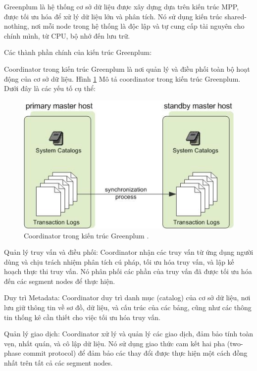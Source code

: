 \documentclass{article}[14pt]
\begin{document}
{Greenplum là hệ thống cơ sở dữ liệu được xây dựng dựa trên kiến
trúc MPP, được tối ưu hóa để xử lý dữ liệu lớn và phân tích. Nó sử dụng kiến
trúc shared-nothing, nơi mỗi node trong hệ thống là độc lập và tự cung cấp tài nguyên cho chính mình, từ CPU, bộ nhớ đến lưu trữ.

Các thành phần chính của kiến trúc Greenplum:

Coordinator trong kiến trúc Greenplum là nơi quản lý và điều phối
toàn bộ hoạt động của cơ sở dữ liệu. Hình \ref{fig:admin_guide-graphics-standby_coordinator} Mô tả coordinator trong kiến trúc Greenplum.
Dưới đây là các yếu tố cụ thể:


\begin{figure}[htbp]
\centerline{\includegraphics[scale=.7]{images/admin_guide-graphics-standby_coordinator.jpg}}
\captionsetup{font=Large}
\caption{Coordinator trong kiến trúc Greenplum \cite{vmware_greenplum}.}
\label{fig:admin_guide-graphics-standby_coordinator}
\end{figure}

Quản lý truy vấn và điều phối: Coordinator nhận các truy vấn từ ứng dụng người dùng và chịu trách nhiệm phân tích cú pháp, tối ưu hóa truy vấn, và lập kế hoạch thực thi truy vấn. Nó phân phối các phần của truy vấn đã được tối ưu hóa đến các segment nodes để thực hiện.


Duy trì Metadata: Coordinator duy trì danh mục (catalog) của cơ sở dữ liệu, nơi lưu giữ thông tin về sơ đồ, dữ liệu, và cấu trúc của các bảng, cũng như các thông tin thống kê cần thiết cho việc tối ưu hóa truy vấn.

Quản lý giao dịch: Coordinator xử lý và quản lý các giao dịch, đảm bảo tính toàn vẹn, nhất quán, và cô lập dữ liệu. Nó sử dụng giao thức cam kết hai pha (two-phase commit protocol) để đảm bảo các thay đổi được thực hiện một cách đồng nhất trên tất cả các segment nodes.

}
\end{document}
